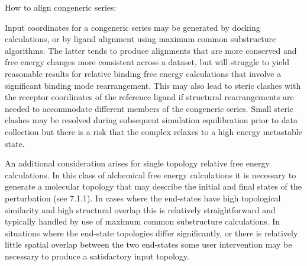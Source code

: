 \documentclass[9pt,bestpractices]{livecoms}
\begin{document}
How to align congeneric series:

Input coordinates for a congeneric series may be generated by docking calculations, or by ligand alignment using maximum common substructure algorithms. The latter tends to produce alignments that are more conserved and free energy changes more consistent across a dataset, but will struggle to yield reasonable results for relative binding free energy calculations that involve a significant binding mode rearrangement. This may also lead to steric clashes with the receptor coordinates of the reference ligand if structural rearrangements are needed to accommodate different members of the congeneric series. Small steric clashes may be resolved during subsequent simulation equilibration prior to data collection but there is a risk that the complex relaxes to a high energy metastable state. 

An additional consideration arises for single topology relative free energy calculations. In this class of alchemical free energy calculations it is necessary to generate a molecular topology that may describe the initial and final states of the perturbation (see 7.1.1). In cases where the end-states have high topological similarity and high structural overlap this is relatively straightforward and typically handled by use of maximum common substructure calculations. In situations where the end-state topologies differ significantly, or there is relatively little spatial overlap between the two end-states some user intervention may be necessary to produce a satisfactory input topology.
\end{document}

